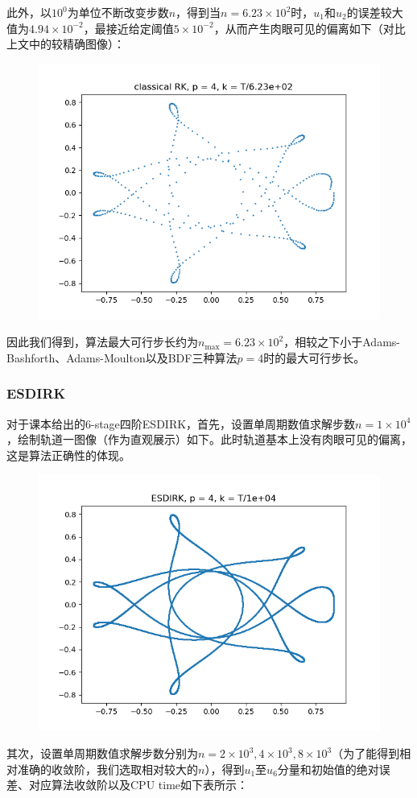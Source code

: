 \documentclass{ctexart}
\begin{document}
\begin{sloppypar}
此外，以$10^0$为单位不断改变步数$n$，得到当$n = 6.23 \times 10^2$时，$u_1$和$u_2$的误差较大值为$4.94 \times 10^{-2}$，最接近给定阈值$5 \times 10^{-2}$，从而产生肉眼可见的偏离如下（对比上文中的较精确图像）：
\begin{figure}[H]
\centering
\includegraphics[scale = 0.45]{./report_src/Figure_65.png}
\end{figure}
因此我们得到，算法最大可行步长约为$n_{\max} = 6.23 \times 10^2$，相较之下小于Adams-Bashforth、Adams-Moulton以及BDF三种算法$p=4$时的最大可行步长。

\subsubsection{ESDIRK}
对于课本给出的6-stage四阶ESDIRK，首先，设置单周期数值求解步数$n = 1 \times 10^4$，绘制轨道一图像（作为直观展示）如下。此时轨道基本上没有肉眼可见的偏离，这是算法正确性的体现。
\begin{figure}[H]
\centering
\includegraphics[scale = 0.45]{./report_src/Figure_66.png}
\end{figure}
其次，设置单周期数值求解步数分别为$n = 2 \times 10^3,4 \times 10^3,8 \times 10^3$（为了能得到相对准确的收敛阶，我们选取相对较大的$n$），得到$u_1$至$u_6$分量和初始值的绝对误差、对应算法收敛阶以及CPU time如下表所示：


\end{sloppypar}
\end{document}
